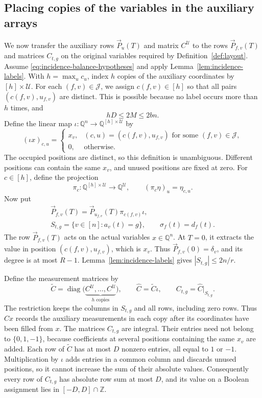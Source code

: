 \subsection{Placing copies of the variables in the auxiliary arrays}\label{subsec:embedding}
We now transfer the auxiliary rows $\vec{P}_u(T)$ and matrix
$C^{\mathcal U}$ to the rows $\vec{P}_{f,v}(T)$ and matrices $C_{t,g}$
on the original variables required by Definition~\ref{def:layout}.
Assume \eqref{eq:incidence-balance-hypotheses} and apply
Lemma~\ref{lem:incidence-labels}. With $h=\max_u c_u$, index $h$
copies of the auxiliary coordinates by $[h]\times\mathcal U$.
For each $(f,v)\in\mathcal J$, we assign $c(f,v)\in[h]$ so that all
pairs $(c(f,v),u_{f,v})$ are distinct. This is possible because no
label occurs more than $h$ times, and
\[
 hD\le2M\le2bn.
\]
Define the linear map
$\iota:\mathbb Q^n\longrightarrow\mathbb Q^{[h]\times\mathcal U}$ by
\[
 (\iota x)_{c,u}=
 \begin{cases}
 x_v,&(c,u)=(c(f,v),u_{f,v})\text{ for some }(f,v)\in\mathcal J,\\
 0,&\text{otherwise}.
 \end{cases}
\]
The occupied positions are distinct, so this definition is unambiguous.
Different positions can contain the same $x_v$, and unused positions
are fixed at zero. For $c\in[h]$, define the projection
\[
 \pi_c:\mathbb Q^{[h]\times\mathcal U}\longrightarrow\mathbb Q^{\mathcal U},
 \qquad (\pi_c\eta)_u=\eta_{c,u}.
\]
Now put
\begin{equation}\label{eq:actual-rows}
 \begin{gathered}
 \vec{P}_{f,v}(T)=\vec{P}_{u_{f,v}}(T)\pi_{c(f,v)}\iota,\\
 S_{t,g}=\{v\in[n]:a_v(t)=g\},\qquad \sigma_f(t)=d_f(t).
 \end{gathered}
\end{equation}
The row $\vec{P}_{f,v}(T)$ acts on the actual variables $x\in\mathbb Q^n$.
At $T=0$, it extracts the value in position $(c(f,v),u_{f,v})$,
which is $x_v$. Thus $\vec{P}_{f,v}(0)=\delta_v$, and its degree is at most
$R-1$. Lemma~\ref{lem:incidence-labels} gives $|S_{t,g}|\le2n/r$.

Define the measurement matrices by
\begin{equation}\label{eq:actual-measurements}
 \widetilde C=\operatorname{diag}
   \bigl(\underbrace{C^{\mathcal U},\ldots,C^{\mathcal U}}_{h\text{ copies}}\bigr),
 \qquad \widehat C=\widetilde C\iota,
 \qquad C_{t,g}=\widehat C|_{S_{t,g}}.
\end{equation}
The restriction keeps the columns in $S_{t,g}$ and all rows, including
zero rows. Thus $\widehat Cx$ records the auxiliary measurements in
each copy after its coordinates have been filled from $x$.
The matrices $C_{t,g}$ are integral. Their entries need not belong to
$\{0,1,-1\}$, because coefficients at several positions containing
the same $x_v$ are added. Each row of $\widetilde C$ has at
most $D$ nonzero entries, all equal to $1$ or $-1$. Multiplication by
$\iota$ adds entries in a common column and discards unused positions,
so it cannot increase
the sum of their absolute values. Consequently every row of $C_{t,g}$
has absolute row sum at most $D$, and its value on a Boolean assignment
lies in $[-D,D]\cap\mathbb Z$.

